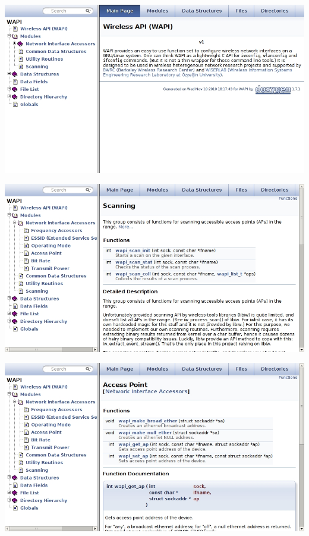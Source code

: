 \documentclass[turkish,12pt,red,compress,mathserif]{beamer}
\begin{document}
\begin{frame}
  \centering\includegraphics[width=\textwidth]{dox1.jpg}
\end{frame}

\begin{frame}
  \centering\includegraphics[width=\textwidth]{dox2.jpg}
\end{frame}

\begin{frame}
  \centering\includegraphics[width=\textwidth]{dox3.jpg}
\end{frame}
\end{document}
